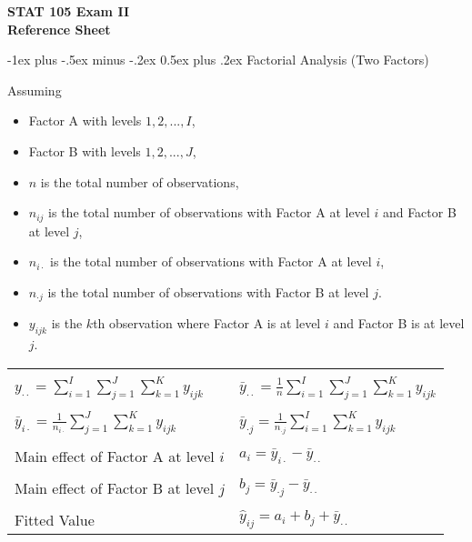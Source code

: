 \documentclass[10pt,landscape]{article}
\makeatletter
\renewcommand{\section}{\@startsection{section}{1}{0mm}%
                                {-1ex plus -.5ex minus -.2ex}%
                                {0.5ex plus .2ex}%
                                {\normalfont\large\bfseries}}
\makeatother
\begin{document}
\raggedright
\footnotesize
\begin{multicols}{2}


\setlength{\premulticols}{1pt}
\setlength{\postmulticols}{1pt}
\setlength{\multicolsep}{1pt}
\setlength{\columnsep}{2pt}

\begin{center}
   \Large{\textbf{STAT 105 Exam II}} \\
   \Large{\textbf{Reference Sheet}} \\
\end{center}

\section{Factorial Analysis (Two Factors)}

Assuming 

\begin{itemize}
   \item Factor A with levels $1, 2, ..., I$, 
   \item Factor B with levels $1, 2, ..., J$, 
   \item $n$ is the total number of observations,
   \item $n_{ij}$ is the total number of observations with Factor A at level $i$ and Factor B at level $j$, 
   \item $n_{i \cdot }$ is the total number of observations with Factor A at level $i$,
   \item $n_{\cdot j}$ is the total number of observations with Factor B at level $j$.
   \item $y_{ijk}$ is the $k$th observation where Factor A is at level $i$ and Factor B is at level $j$.
\end{itemize}

\begin{tabular}{@{}ll@{}}
        & \\
   $y_{\cdot \cdot} = \sum_{i = 1}^I \sum_{j = 1}^J \sum_{k=1}^K y_{ijk} $ & $\bar{y}_{\cdot \cdot} = \frac{1}{n}\sum_{i = 1}^I \sum_{j = 1}^J \sum_{k=1}^K y_{ijk} $ \\
        & \\
   $\bar{y}_{i \cdot} = \frac{1}{n_{i\cdot}} \sum_{j = 1}^J \sum_{k=1}^K y_{ijk} $ & $\bar{y}_{\cdot j} = \frac{1}{n_{\cdot j}} \sum_{i = 1}^I \sum_{k=1}^K y_{ijk} $ \\
        & \\
   Main effect of Factor A at level $i$ & $a_i = \bar{y}_{i \cdot} - \bar{y}_{\cdot \cdot}$ \\
        & \\
   Main effect of Factor B at level $j$ & $b_j = \bar{y}_{\cdot j} - \bar{y}_{\cdot \cdot}$ \\
        & \\
   Fitted Value & $\hat{y}_{ij} = a_i + b_j + \bar{y}_{\cdot \cdot}$
        & \\
\end{tabular}


\end{multicols}
\end{document}
